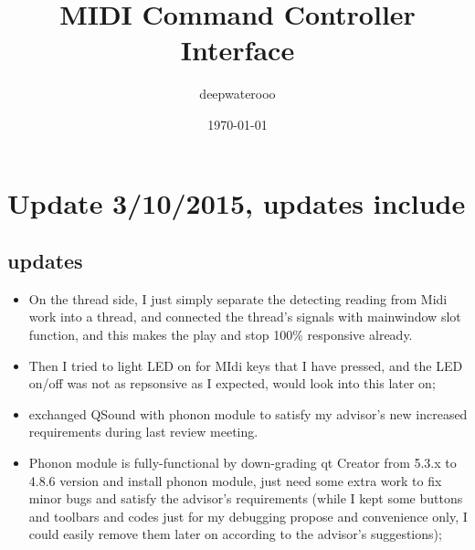 \documentclass[9pt,b5paper]{article}
\author{deepwaterooo}
\date{\today}
\title{MIDI Command Controller Interface}
\begin{document}
\maketitle
\tableofcontents


\section{Update 3/10/2015, updates include}
\label{sec-1}
\subsection{updates}
\label{sec-1-1}
\begin{itemize}
\item On the thread side, I just simply separate the detecting reading from Midi work into a thread, and connected the thread's signals with mainwindow slot function, and this makes the play and stop 100\% responsive already.
\item Then I tried to light LED on for MIdi keys that I have pressed, and the LED on/off was not as repsonsive as I expected, would look into this later on;
\item exchanged QSound with phonon module to satisfy my advisor's new increased requirements during last review meeting.
\item Phonon module is fully-functional by down-grading qt Creator from 5.3.x to 4.8.6 version and install phonon module, just need some extra work to fix minor bugs and satisfy the advisor's requirements (while I kept some buttons and toolbars and codes just for my debugging propose and convenience only, I could easily remove them later on according to the advisor's suggestions);
\end{itemize}
\end{document}
